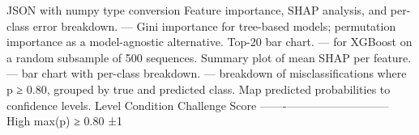 {}\markdownRendererPipe{}  \markdownRendererPipe{} JSON with numpy type conversion \markdownRendererPipe{}\markdownRendererInterblockSeparator
{}\markdownRendererThematicBreak{}\markdownRendererInterblockSeparator
{}
\markdownRendererSectionEnd \markdownRendererSectionBegin
{}\markdownRendererInterblockSeparator
{} Feature importance, SHAP analysis, and per-class error breakdown.\markdownRendererParagraphSeparator
{}\markdownRendererInterblockSeparator
{}\markdownRendererOlBegin
{} — Gini importance for tree-based models; permutation importance\markdownRendererSoftLineBreak
{}as a model-agnostic alternative. Top-20 bar chart.\markdownRendererOlItemEnd 
{} —  for XGBoost on a random subsample of 500 sequences.\markdownRendererSoftLineBreak
{}Summary plot of mean \markdownRendererPipe{}SHAP\markdownRendererPipe{} per feature.\markdownRendererOlItemEnd 
{} — bar chart with per-class breakdown.\markdownRendererOlItemEnd 
{} — breakdown of misclassifications where p ≥ 0.80,\markdownRendererSoftLineBreak
{}grouped by true and predicted class.\markdownRendererOlItemEnd 
\markdownRendererOlEnd \markdownRendererInterblockSeparator
{}\markdownRendererThematicBreak{}\markdownRendererInterblockSeparator
{}
\markdownRendererSectionEnd \markdownRendererSectionBegin
{}\markdownRendererInterblockSeparator
{} Map predicted probabilities to confidence levels.\markdownRendererParagraphSeparator
{}\markdownRendererPipe{} Level \markdownRendererPipe{} Condition \markdownRendererPipe{} Challenge Score \markdownRendererPipe{}\markdownRendererSoftLineBreak
{}\markdownRendererPipe{}-------\markdownRendererPipe{}-----------\markdownRendererPipe{}-----------------\markdownRendererPipe{}\markdownRendererSoftLineBreak
{}\markdownRendererPipe{} High \markdownRendererPipe{} max(p) ≥ 0.80 \markdownRendererPipe{} ±1 \markdownRendererPipe{}\markdownRendererSoftLineBreak
